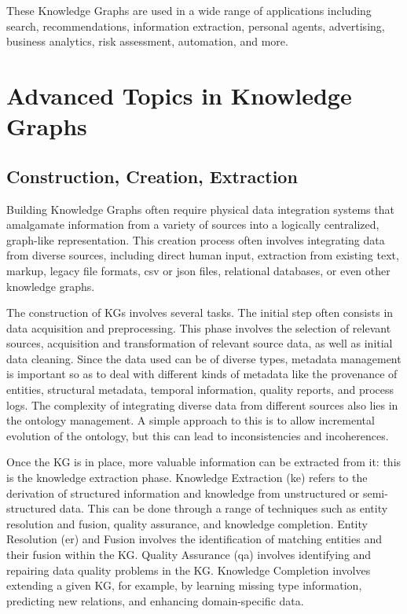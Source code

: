 \documentclass[11pt]{article} %
\begin{document}
These Knowledge Graphs are used in a wide range of applications including search, recommendations, information extraction, personal agents, advertising, business analytics, risk assessment, automation, and more.

\section{Advanced Topics in Knowledge Graphs}

\subsection{Construction, Creation, Extraction}

Building Knowledge Graphs often require physical data integration systems that amalgamate information from a variety of sources into a logically centralized, graph-like representation. This creation process often involves integrating data from diverse sources, including direct human input, extraction from existing text, markup, legacy file formats, csv or json files, relational databases, or even other knowledge graphs. 

The construction of KGs involves several tasks. The initial step often consists in data acquisition and preprocessing. This phase involves the selection of relevant sources, acquisition and transformation of relevant source data, as well as initial data cleaning. Since the data used can be of diverse types, metadata management is important so as to deal with different kinds of metadata like the provenance of entities, structural metadata, temporal information, quality reports, and process logs. The complexity of integrating diverse data from different sources also lies in the ontology management. A simple approach to this is to allow incremental evolution of the ontology, but this can lead to inconsistencies and incoherences.

Once the KG is in place, more valuable information can be extracted from it: this is the knowledge extraction phase. Knowledge Extraction (\acrshort{ke}) refers to the derivation of structured information and knowledge from unstructured or semi-structured data. This can be done through a range of techniques such as entity resolution and fusion, quality assurance, and knowledge completion. Entity Resolution (\acrshort{er}) and Fusion involves the identification of matching entities and their fusion within the KG. Quality Assurance (\acrshort{qa}) involves identifying and repairing data quality problems in the KG. Knowledge Completion involves extending a given KG, for example, by learning missing type information, predicting new relations, and enhancing domain-specific data.
\end{document}
